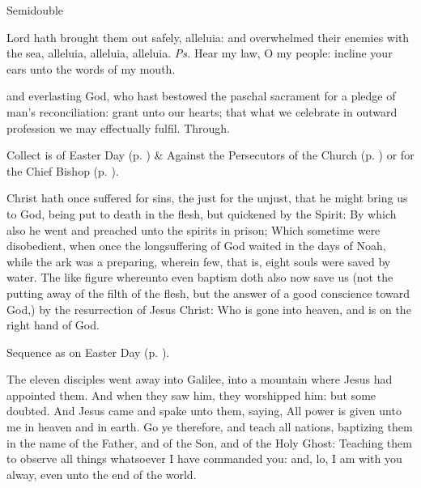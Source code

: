 \begin{inhead}
    {Semidouble}
\end{inhead}

\properantiphonfix

\introit
{} Lord hath brought them out safely, alleluia: and overwhelmed their enemies with the sea, alleluia, alleluia, alleluia. \textit{Ps.} Hear my law, O my people: incline your ears unto the words of my mouth.

\collect
{} and everlasting God, who hast bestowed the paschal sacrament for a pledge of man's reconciliation: grant unto our hearts; that what we celebrate in outward profession we may effectually fulfil. Through.
\begin{rubric}
     Collect is of Easter Day (p. \pageref{EasterCollect}) \&  Against the Persecutors of the Church (p. \pageref{SPAgainst}) or for the Chief Bishop (p. \pageref{SPChiefBishop}).
\end{rubric}

 Christ hath once suffered for sins, the just for the unjust, that he might bring us to God, being put to death in the flesh, but quickened by the Spirit: By which also he went and preached unto the spirits in prison; Which sometime were disobedient, when once the longsuffering of God waited in the days of Noah, while the ark was a preparing, wherein few, that is, eight souls were saved by water. The like figure whereunto even baptism doth also now save us (not the putting away of the filth of the flesh, but the answer of a good conscience toward God,) by the resurrection of Jesus Christ: Who is gone into heaven, and is on the right hand of God.


\begin{rubric}
    Sequence as on Easter Day (p. \pageref{PaschalSequence}).
\end{rubric}

 The eleven disciples went away into Galilee, into a mountain where Jesus had appointed them. And when they saw him, they worshipped him: but some doubted. And Jesus came and spake unto them, saying, All power is given unto me in heaven and in earth. Go ye therefore, and teach all nations, baptizing them in the name of the Father, and of the Son, and of the Holy Ghost: Teaching them to observe all things whatsoever I have commanded you: and, lo, I am with you alway, even unto the end of the world.

